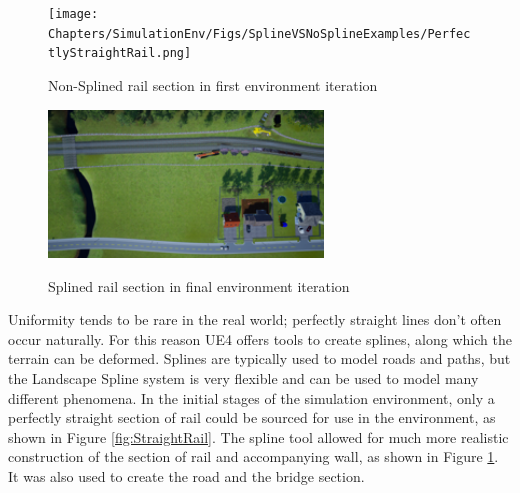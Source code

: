 \begin{figure}
    \centering
    \texttt{[image: Chapters/SimulationEnv/Figs/SplineVSNoSplineExamples/PerfectlyStraightRail.png]}
    \caption{Non-Splined rail section in first environment iteration}
    \label{fig:StraightRail}
    \includegraphics[width=0.65\textwidth]{Chapters/SimulationEnv/Figs/SplineVSNoSplineExamples/resized_SplineExample1.png}
    \label{fig:SplinedRail}
    \caption{Splined rail section in final environment iteration}
    
\end{figure}

Uniformity tends to be rare in the real world; perfectly straight lines don't often occur naturally. For this reason UE4 offers tools to create splines, along which the terrain can be deformed. Splines are typically used to model roads and paths, but the Landscape Spline system is very flexible and can be used to model many different phenomena. In the initial stages of the simulation environment, only a perfectly straight section of rail could be sourced for use in the environment, as shown in Figure \ref{fig:StraightRail}. The spline tool allowed for much more realistic construction of the section of rail and accompanying wall, as shown in Figure \ref{fig:SplinedRail}. It was also used to create the road and the bridge section. %


